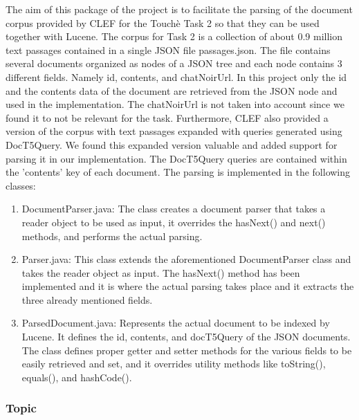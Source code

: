             The aim of this package of the project is to facilitate the parsing of the document corpus provided by CLEF for the Touchè Task 2 so that they can be used together with Lucene. The corpus for Task 2 is a collection of about 0.9 million text passages contained in a single JSON file passages.json. The file contains several documents organized as nodes of a JSON tree and each node contains 3 different fields. Namely id, contents, and chatNoirUrl. In this project only the id and the contents data of the document are retrieved from the JSON node and used in the implementation. The chatNoirUrl is not taken into account since we found it to not be relevant for the task. Furthermore, CLEF also provided a version of the corpus with text passages expanded with queries generated using DocT5Query. We found this expanded version valuable and added support for parsing it in our implementation. The DocT5Query queries are contained within the 'contents' key of each document. The parsing is implemented in the following classes:
            \begin{enumerate}
                \item 
                    DocumentParser.java: The class creates a document parser that takes a reader object to be used as input, it overrides the hasNext() and next() methods, and performs the actual parsing.
                \item 
                    Parser.java: This class extends the aforementioned DocumentParser class and takes the reader object as input. The hasNext() method has been implemented and it is where the actual parsing takes place and it extracts the three already mentioned fields.
                \item
                    ParsedDocument.java: Represents the actual document to be indexed by Lucene. It defines the id, contents, and docT5Query of the JSON documents. The class defines proper getter and setter methods for the various fields to be easily retrieved and set, and it overrides utility methods like toString(), equals(), and hashCode().
            \end{enumerate}
\subsubsection{Topic}
        
